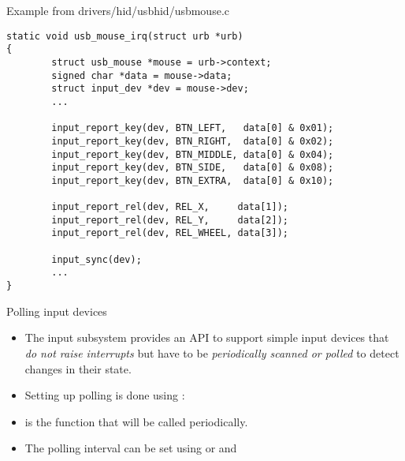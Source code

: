 \begin{frame}[fragile]{Example from drivers/hid/usbhid/usbmouse.c}
  \begin{block}{}
  \begin{verbatim}
static void usb_mouse_irq(struct urb *urb)
{
        struct usb_mouse *mouse = urb->context;
        signed char *data = mouse->data;
        struct input_dev *dev = mouse->dev;
        ...

        input_report_key(dev, BTN_LEFT,   data[0] & 0x01);
        input_report_key(dev, BTN_RIGHT,  data[0] & 0x02);
        input_report_key(dev, BTN_MIDDLE, data[0] & 0x04);
        input_report_key(dev, BTN_SIDE,   data[0] & 0x08);
        input_report_key(dev, BTN_EXTRA,  data[0] & 0x10);

        input_report_rel(dev, REL_X,     data[1]);
        input_report_rel(dev, REL_Y,     data[2]);
        input_report_rel(dev, REL_WHEEL, data[3]);

        input_sync(dev);
        ...
}
  \end{verbatim}
  \end{block}
\end{frame}

\begin{frame}[fragile]{Polling input devices}
  \begin{itemize}
  \item The input subsystem provides an API to support simple input
    devices that {\em do not raise interrupts} but have to be {\em
      periodically scanned or polled} to detect changes in their
    state.
  \item Setting up polling is done using :
  \item {} is the function that will be called
    periodically.
  \item The polling interval can be set using
     or
     and
  \end{itemize}
\end{frame}

